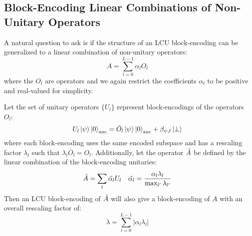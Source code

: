 \subsection{Block-Encoding Linear Combinations of Non-Unitary Operators}
\label{subsec:lco}

A natural question to ask is if the structure of an LCU block-encoding can be generalized to a linear combination of non-unitary operators:
\begin{equation}
    \label{eq:lco}
    A = \sum_{l=0}^{L-1} \alpha_l O_l
\end{equation}
where the $O_l$ are operators and we again restrict the coefficients $\alpha_l$ to be positive and real-valued for simplicity.

Let the set of unitary operators $\{U_l\}$ represent block-encodings of the operators $O_l$:
\begin{equation}
    \label{eq:applying-operator}
    U_l \ket{\psi}\ket{0}_\text{anc} = \bar{O}_l \ket{\psi} \ket{0}_\text{anc} + \beta_{\psi, l} \ket{\perp}
\end{equation}
where each block-encoding uses the same encoded subspace and has a rescaling factor $\lambda_l$ such that $\lambda_l \bar{O}_l = O_l$.
Additionally, let the operator $\Tilde{A}$ be defined by the linear combination of the block-encoding unitaries:
\begin{equation}
    \Tilde{A} = \sum_{l} \Tilde{\alpha_l} U_l \hspace{1em} \Tilde{\alpha_l} = \frac{\alpha_l \lambda_l}{\max_{l^\prime}{\lambda_{l^\prime}}}
\end{equation} 
Then an LCU block-encoding of $\Tilde{A}$ will also give a block-encoding of $A$ with an overall rescaling factor of:
\begin{equation}
    \lambda = \sum_{l=0}^{L-1} |\alpha_l \lambda_l|
\end{equation}

